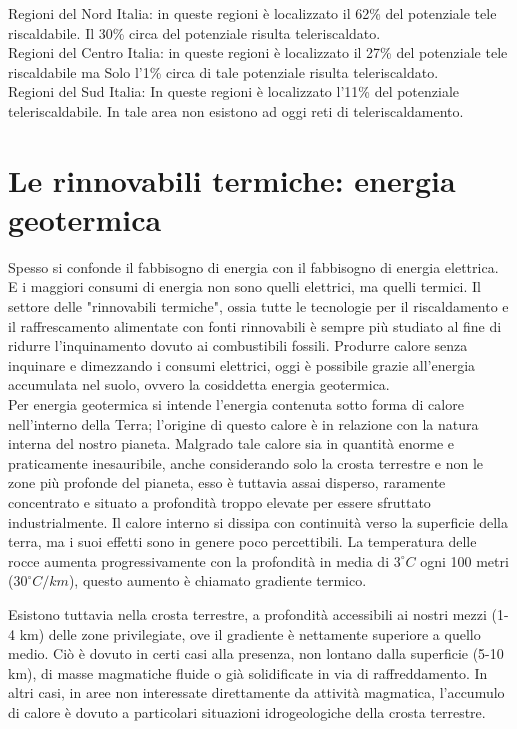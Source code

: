 \documentclass[laurea,oneside,11pt]{USiena_tesiLM}
\begin{document}
Regioni del Nord Italia: in queste regioni è localizzato il 62\% del potenziale tele riscaldabile. Il 30\% circa del potenziale risulta teleriscaldato. \\

Regioni del Centro Italia: in queste regioni è localizzato il 27\% del potenziale tele riscaldabile ma Solo l'1\% circa di tale potenziale risulta teleriscaldato. \\

Regioni del Sud Italia: In queste regioni è localizzato l'11\% del potenziale teleriscaldabile. In tale area non esistono ad oggi reti di teleriscaldamento.

\section{Le rinnovabili termiche: energia geotermica}
Spesso si confonde il fabbisogno di energia con il fabbisogno di energia elettrica. E i maggiori consumi di energia non sono quelli elettrici, ma quelli termici. Il settore delle "rinnovabili termiche", ossia tutte le tecnologie per il riscaldamento e il raffrescamento alimentate con fonti rinnovabili è sempre più studiato  al fine di ridurre l'inquinamento dovuto ai combustibili fossili.
Produrre calore senza inquinare e dimezzando i consumi elettrici, oggi è possibile grazie all'energia accumulata nel suolo, ovvero la cosiddetta energia geotermica.\\

Per energia geotermica si intende l'energia contenuta sotto forma  di calore nell'interno della Terra; l'origine di questo calore è in relazione con la natura interna del nostro pianeta. Malgrado tale calore sia in quantità enorme e praticamente inesauribile, anche considerando solo la crosta terrestre e non le zone più profonde del pianeta, esso è tuttavia assai disperso, raramente concentrato e situato a profondità troppo elevate per essere sfruttato industrialmente. Il calore interno si dissipa con continuità verso la superficie della terra, ma i suoi effetti sono in genere poco percettibili. La temperatura delle rocce aumenta progressivamente con la profondità in media di $3 ^{\circ }C$ ogni 100 metri ($30 ^{\circ} C/km$), questo aumento è chiamato gradiente termico.

Esistono tuttavia nella crosta terrestre, a profondità accessibili ai nostri mezzi (1-4 km) delle zone privilegiate, ove il gradiente è nettamente superiore a quello medio. Ciò è dovuto in certi casi alla presenza, non lontano dalla superficie (5-10 km), di masse magmatiche fluide o già solidificate in via di raffreddamento. In altri casi, in aree non interessate direttamente da attività magmatica, l'accumulo di calore è dovuto a particolari situazioni idrogeologiche della crosta terrestre.
\end{document}
